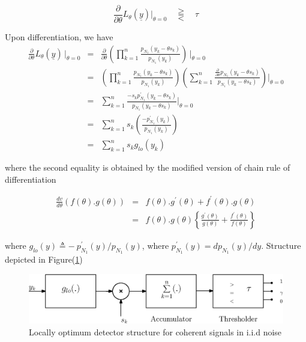 \documentclass[12pt]{report}
\begin{document}
	\begin{equation}
	\frac{\partial}{\partial\theta}L_{\theta}(\underline{y})\big|_{\theta=0}\quad\gtreqqless\quad \tau
	\end{equation}
	
	Upon differentiation, we have
	\begin{eqnarray}
	\frac{{\partial}}{\partial\theta}L_{\theta}(\underline{y})\hspace{2pt}|_{\theta=0}&=&\frac{\partial}{\partial\theta}\left(\prod_{k=1}^n\frac{p_{N_{1}}(y_{k}-\theta{s_{k}})}{p_{N_{1}}(y_{k})}\right)\hspace{2pt}\Bigg|_{\theta=0}\nonumber\\
	&=&\left(\prod_{k=1}^n\frac{p_{N_{1}}(y_{k}-\theta{s_{k}})}{p_{N_{1}}(y_{k})}\right)\left(\sum_{k=1}^{n}\frac{\frac{\partial}{\partial\theta}p_{N_{1}}(y_{k}-\theta{s_{k}})}{p_{N_{1}}(y_{k}-\theta{s_{k}})}\right)\Bigg|_{\theta=0}\nonumber\\
	&=&\sum_{k=1}^{n}\frac{-s_{k}p_{N_{1}}^\prime(y_{k}-\theta{s_{k}})}{p_{N_{1}}(y_{k}-\theta{s_{k}})}\Bigg|_{\theta=0}\nonumber\\
	&=&\sum_{k=1}^{n}s_{k}\left(\frac{-p_{N_{1}}^\prime(y_{k})}{p_{N_{1}}(y_{k})}\right)\nonumber\\
	&=&\sum_{k=1}^{n}s_{k}g_{lo}(y_{k})
	\end{eqnarray}
	
	\noindent where the second equality is obtained by the modified version of chain rule of differentiation
	
	\begin{eqnarray}
	\frac{{dv}}{d\theta}(f(\theta).g(\theta))&=& f(\theta).g^{'}(\theta)+f^{'}(\theta).g(\theta)\nonumber\\
	&=&f(\theta).g(\theta)\left\{\frac{g^{'}(\theta)}{g(\theta)} + \frac{f^{'}(\theta)}{f(\theta)}\right\}
	\end{eqnarray}
	 
	\noindent where $g_{lo}(y)\triangleq-\ p_{N_{1}}^\prime(y)/p_{N_{1}}(y)$, where $p_{N_{1}}^\prime(y)=dp_{N_{1}}(y)/dy.$ Structure  depicted in Figure(\ref{fig:loc_opt_detector})
	
	\begin{figure}[h]
		\centering
		\includegraphics[scale=0.7]{Figures/loc_opt_detector.eps}
		\caption{Locally optimum detector structure for coherent signals in i.i.d noise}
		\label{fig:loc_opt_detector}
	\end{figure}
	
\end{document}
